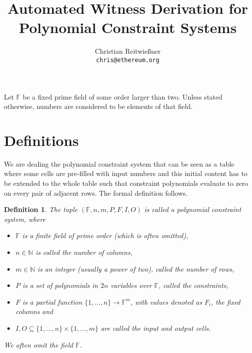 \documentclass[11pt,letterpaper]{article}
\date{}
\newtheorem{definition}[dummytheorem]{Definition}
\newcommand{\uint}{\mathbb{N}}
\newcommand{\ff}{\mathbb{F}}
\begin{document}


\title{Automated Witness Derivation for Polynomial Constraint Systems}

\author{Christian Reitwießner \\ 
{\tt chris@ethereum.org}}


\maketitle


Let $\ff$ be a fixed prime field of some order larger than two. Unless stated otherwise,
numbers are considered to be elements of that field.

\section{Definitions}

We are dealing the polynomial constraint system that can be seen as a table where some
cells are pre-filled with input numbers and this initial content has to be extended to the whole
table such that constraint polynomials evaluate to zero on every pair of adjacent rows.
The formal definition follows.

\begin{definition}
The tuple $(\ff, n, m, P, F, I, O)$ is called a \emph{polynomial constraint system}, where
\begin{itemize}
\item $\ff$ is a finite field of prime order (which is often omitted),
\item $n \in \uint$ is called the \emph{number of columns},
\item $m \in \uint$ is an integer (usually a power of two), called the \emph{number of rows},
\item $P$ is a set of polynomials in $2 n$ variables over $\ff$, called \emph{the constraints},
\item $F$ is a partial function $\{1,\dots,n\} \to \ff^m$, with values denoted as $F_i$, the \emph{fixed columns} and
\item $I, O \subseteq \{1,\dots,n\}\times\{1,\dots,m\}$ are called the \emph{input} and \emph{output} cells.
\end{itemize}
We often omit the field $\ff$.
\end{definition}
\end{document}
